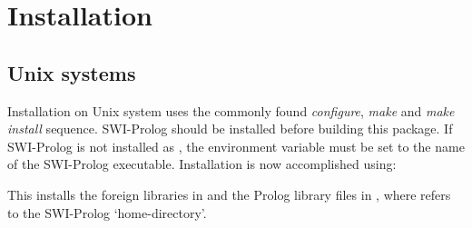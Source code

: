 \documentclass[11pt]{article}
\begin{document}
\section{Installation}

\subsection{Unix systems}

Installation on Unix system uses the commonly found {\em configure},
{\em make} and {\em make install} sequence. SWI-Prolog should be
installed before building this package. If SWI-Prolog is not installed
as , the environment variable  must be set to the
name of the SWI-Prolog executable. Installation is now accomplished
using:

\begin{code}
\end{code}

\noindent
This installs the foreign libraries in  and
the Prolog library files in , where
 refers to the SWI-Prolog `home-directory'.

\printindex
\end{document}
